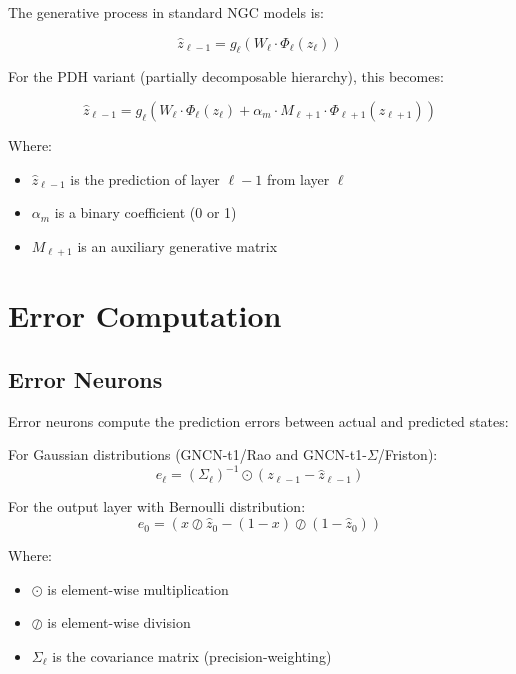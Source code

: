 \documentclass{article}
\begin{document}
The generative process in standard NGC models is:

\begin{equation}
  \hat{z}_{\ell-1} = g_\ell(W_\ell \cdot \Phi_\ell(z_\ell))
\end{equation}

For the PDH variant (partially decomposable hierarchy), this becomes:

\begin{equation}
  \hat{z}_{\ell-1} = g_\ell(W_\ell \cdot \Phi_\ell(z_\ell) + \alpha_m \cdot M_{\ell+1} \cdot \Phi_{\ell+1}(z_{\ell+1}))
\end{equation}

Where:
\begin{itemize}
  \item $\hat{z}_{\ell-1}$ is the prediction of layer $\ell-1$ from layer $\ell$
  \item $\alpha_m$ is a binary coefficient (0 or 1)
  \item $M_{\ell+1}$ is an auxiliary generative matrix
\end{itemize}

\section{Error Computation}

\subsection{Error Neurons}

Error neurons compute the prediction errors between actual and predicted states:

For Gaussian distributions (GNCN-t1/Rao and GNCN-t1-$\Sigma$/Friston):
\begin{equation}
  e_\ell = (\Sigma_\ell)^{-1} \odot (z_{\ell-1} - \hat{z}_{\ell-1})
\end{equation}

For the output layer with Bernoulli distribution:
\begin{equation}
  e_0 = (x \oslash \hat{z}_0 - (1-x) \oslash (1-\hat{z}_0))
\end{equation}

Where:
\begin{itemize}
  \item $\odot$ is element-wise multiplication
  \item $\oslash$ is element-wise division
  \item $\Sigma_\ell$ is the covariance matrix (precision-weighting)
\end{itemize}
\end{document}
